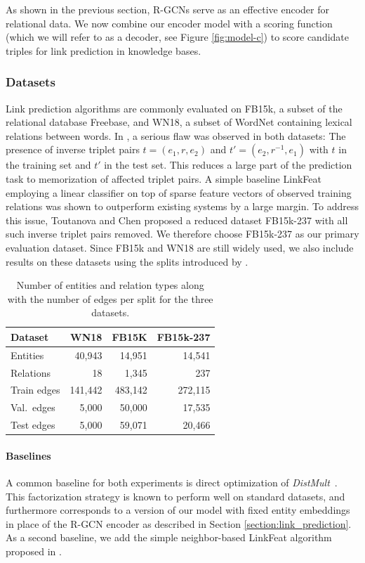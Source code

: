 As shown in the previous section, R-GCNs serve as an effective encoder for relational data. We now combine our encoder model with a scoring function (which we will refer to as a decoder, see Figure \ref{fig:model-c}) to score candidate triples for link prediction in knowledge bases.

\subsubsection{Datasets}
Link prediction algorithms are commonly evaluated on FB15k, a subset of the relational database Freebase, and WN18, a subset of WordNet containing lexical relations between words. In \citet{toutanova2015observed}, a serious flaw was observed in both datasets: The presence of inverse triplet pairs $t = (e_1, r, e_2)$ and $t' = (e_2, r^{-1}, e_1)$ with $t$ in the training set and $t'$ in the test set. This reduces a large part of the prediction task to memorization of affected triplet pairs. A simple baseline LinkFeat employing a linear classifier on top of sparse feature vectors of observed training relations was shown to outperform existing systems by a large margin. To address this issue, Toutanova and Chen proposed a reduced dataset FB15k-237 with all such inverse triplet pairs removed. We therefore choose FB15k-237 as our primary evaluation dataset. Since FB15k and WN18 are still widely used, we also include results on these datasets using the splits introduced by \citet{bordes2013translating}.

\begin{table}[ht]
\centering
\begin{tabular}{lrrr}
\toprule
Dataset & WN18 & FB15K & FB15k-237\\ \midrule
Entities    & 40,943  & 14,951 & 14,541\\
Relations   & 18 & 1,345 & 237\\
Train edges & 141,442 & 483,142 & 272,115\\
Val.~edges & 5,000 & 50,000 & 17,535\\
Test edges & 5,000 & 59,071 & 20,466\\ \bottomrule
\end{tabular}
\caption{Number of entities and relation types along with the number of edges per split for the three datasets.\label{table:datasets}}
\end{table}

\paragraph{Baselines}
A common baseline for both experiments is direct optimization of \textit{DistMult}~\cite{distmult-embedding_entities_and_relations}. This factorization strategy is known to perform well on standard datasets, and furthermore corresponds to a version of our model with fixed entity embeddings in place of the R-GCN encoder as described in Section \ref{section:link_prediction}. As a second baseline, we add the simple neighbor-based LinkFeat algorithm proposed in \citet{toutanova2015observed}.

